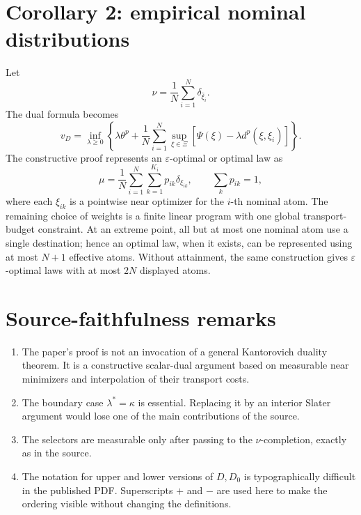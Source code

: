 \section{Corollary 2: empirical nominal distributions}
Let
\[
 \nu=\frac1N\sum_{i=1}^N\delta_{\widehat\xi_i}.
\]
The dual formula becomes
\[
 v_D=\inf_{\lambda\ge0}
 \left\{\lambda\theta^p+
 \frac1N\sum_{i=1}^N
   \sup_{\xi\in\Xi}
    [\Psi(\xi)-\lambda d^p(\xi,\widehat\xi_i)]\right\}.
\]
The constructive proof represents an \(\varepsilon\)-optimal or optimal law as
\[
 \mu=\frac1N\sum_{i=1}^N\sum_{k=1}^{K_i}p_{ik}\delta_{\xi_{ik}},
 \qquad \sum_kp_{ik}=1,
\]
where each \(\xi_{ik}\) is a pointwise near optimizer for the \(i\)-th nominal atom.  The remaining
choice of weights is a finite linear program with one global transport-budget constraint.  At an
extreme point, all but at most one nominal atom use a single destination; hence an optimal law, when
it exists, can be represented using at most \(N+1\) effective atoms.  Without attainment, the same
construction gives \(\varepsilon\)-optimal laws with at most \(2N\) displayed atoms.

\section{Source-faithfulness remarks}
\begin{enumerate}[leftmargin=2em]
\item The paper's proof is not an invocation of a general Kantorovich duality theorem.  It is a
constructive scalar-dual argument based on measurable near minimizers and interpolation of their
transport costs.
\item The boundary case \(\lambda^*=\kappa\) is essential.  Replacing it by an interior Slater
argument would lose one of the main contributions of the source.
\item The selectors are measurable only after passing to the \(\nu\)-completion, exactly as in the
source.
\item The notation for upper and lower versions of \(D,D_0\) is typographically difficult in the
published PDF.  Superscripts \(+\) and \(-\) are used here to make the ordering visible without
changing the definitions.
\end{enumerate}



